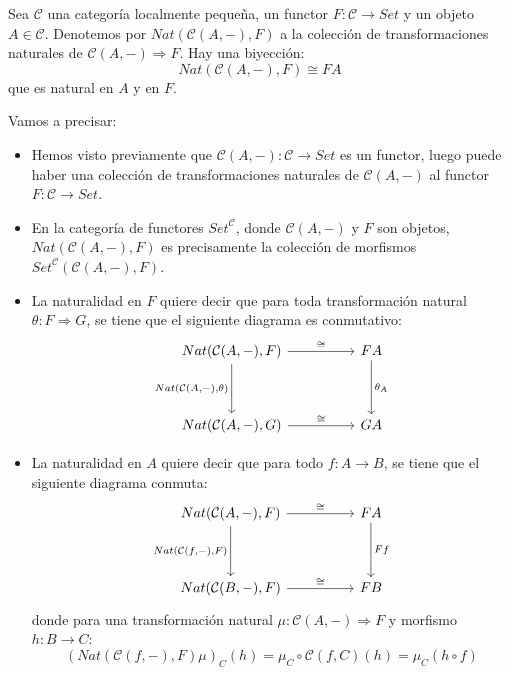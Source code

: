 \documentclass[12pt, twoside]{book}
\newcommand{\cat}{{\mathcal{C}}}
\newcommand{\Set}{{Set}}
\begin{document}
\begin{lemma}
Sea $\cat$ una categoría localmente pequeña, un functor $F \colon \cat \to \Set$ y un objeto $A \in \cat$.
Denotemos por $Nat(\cat(A,-), F)$ a la colección de transformaciones naturales de $\cat(A,-) \Rightarrow F$.
Hay una biyección:
\[ Nat(\cat(A,-), F) \cong F A \]
que es natural en $A$ y en $F$.
\end{lemma}
Vamos a precisar:
\begin{itemize}
  \item Hemos visto previamente que $\cat(A,-) \colon \cat \to \Set$ es un functor, luego puede haber una colección de transformaciones naturales de $\cat(A,-)$ al functor $F \colon \cat \to \Set$.
  \item  En la categoría de functores $\Set^{\cat}$, donde $\cat(A,-)$ y $F$ son objetos, $Nat(\cat(A,-),F)$ es precisamente la colección de morfismos $\Set^{\cat}(\cat(A,-),F)$.
  \item La naturalidad en $F$ quiere decir que para toda transformación natural $\theta \colon F \Rightarrow G$, se tiene que el siguiente diagrama es conmutativo:
\[
\begin{tikzcd}
  {Nat(\cat(A,-),F)} \arrow[rr,"\cong"] \arrow[dd,"{Nat(\cat(A,-),\theta)}" left] & & F A \arrow[dd,"\theta_A"]\\
  &\\
  {Nat(\cat(A,-),G)} \arrow[rr,"\cong"] & & G A
\end{tikzcd}
\]
  \item La naturalidad en $A$ quiere decir que para todo $f \colon A \to B$, se tiene que el siguiente diagrama conmuta:
  \[
\begin{tikzcd}
  {Nat(\cat(A,-),F)} \arrow[rr,"\cong"] \arrow[dd,"{Nat(\cat(f,-),F)}" left] & & F A \arrow[dd,"F f"]\\
  &\\
  {Nat(\cat(B,-),F)} \arrow[rr,"\cong"] & & F B
\end{tikzcd}
\]
  donde para una transformación natural $\mu \colon \cat(A,-) \Rightarrow F$ y morfismo $h \colon B \to C$:
  \[ (Nat(\cat(f,-),F)\mu)_C(h) = \mu_C \circ \cat(f,C)(h) = \mu_C (h \circ f) \]
\end{itemize}
\end{document}
